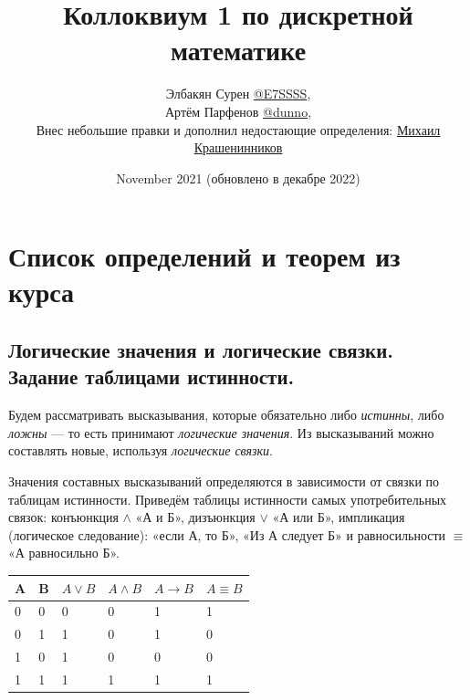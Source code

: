 \documentclass[a4paper, 10pt]{article}
\title{Коллоквиум 1 по дискретной математике}
\author{Элбакян Сурен  \href{https://t.me/E7SSSS}{@E7SSSS}, \\ Артём Парфенов \href{https://t.me/dunno_0}{@dunno}, \\ Внес небольшие правки и дополнил недостающие определения: \href{https://t.me/technothecow}{Михаил Крашенинников}}
\date{November 2021 (обновлено в декабре 2022)}
\begin{document}
\maketitle

\tableofcontents

\newpage

\section{Список определений и теорем из курса}

\subsection{Логические значения и логические связки. Задание таблицами истинности.}


Будем рассматривать высказывания, которые обязательно либо \textit{истинны}, либо \textit{ложны} --- то есть принимают \textit{логические значения}. Из высказываний можно составлять новые, используя \textit{логические связки}.

Значения составных высказываний определяются в зависимости от связки по таблицам истинности. Приведём таблицы истинности самых употребительных связок: конъюнкция $\wedge$ «А и Б», дизъюнкция $\vee$ «А или Б», импликация (логическое следование): «если А, то Б», «Из А следует Б» и равносильности $\equiv$ «А равносильно Б».

\begin{center}
	\begin{table}[h]
		\centering
		\begin{tabular}{|l|l|l|l|l|l|}
			\hline
			\multicolumn{1}{|c|}{A} & B & $A \vee B$ & $A \wedge B$ & $A \to B$ & $A \equiv B $\\ \hline
			0                       & 0 & 0                       & 0                         & 1                      & 1                         \\ \hline
			0                       & 1 & 1                       & 0                         & 1                      & 0                         \\ \hline
			1                       & 0 & 1                       & 0                         & 0                      & 0                         \\ \hline
			1                       & 1 & 1                       & 1                         & 1                      & 1                         \\ \hline
		\end{tabular}
	\end{table}
\end{center}
\end{document}
